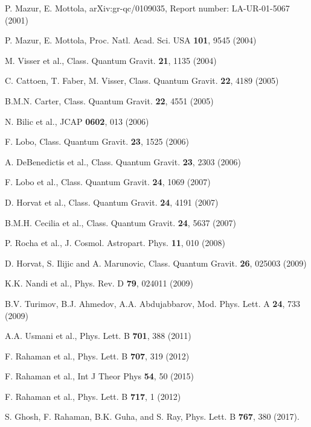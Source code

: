 \documentclass[preprint,12pt]{elsarticle}
\begin{document}
\begin{thebibliography}{99}

 P. Mazur, E. Mottola, arXiv:gr-qc/0109035, Report number: LA-UR-01-5067 (2001)

 P. Mazur, E. Mottola, Proc. Natl. Acad. Sci. USA \textbf{101}, 9545 (2004)

 M. Visser et al., Class. Quantum Gravit. \textbf {21}, 1135 (2004)

 C. Cattoen, T. Faber, M. Visser, Class. Quantum Gravit. \textbf {22}, 4189 (2005)

 B.M.N. Carter, Class. Quantum Gravit. \textbf{22}, 4551 (2005)

 N. Bilic et al., JCAP \textbf{0602}, 013 (2006)

 F. Lobo, Class. Quantum Gravit. \textbf{23}, 1525 (2006)

 A. DeBenedictis et al., Class. Quantum Gravit. \textbf{23}, 2303 (2006)

 F. Lobo et al., Class. Quantum Gravit. \textbf{24}, 1069 (2007)

 D. Horvat et al., Class. Quantum Gravit. \textbf{24}, 4191 (2007)

 B.M.H. Cecilia et al., Class. Quantum Gravit. \textbf{24}, 5637 (2007)

 P. Rocha et al., J. Cosmol. Astropart. Phys. \textbf{11}, 010 (2008)

 D. Horvat, S. Ilijic and A. Marunovic, Class. Quantum Gravit. \textbf{26}, 025003 (2009)

 K.K. Nandi et al., Phys. Rev. D {\bf 79}, 024011 (2009)

 B.V. Turimov, B.J. Ahmedov, A.A. Abdujabbarov, Mod. Phys. Lett. A \textbf{24}, 733 (2009)

 A.A. Usmani et al., Phys. Lett. B \textbf{701}, 388 (2011)

 F. Rahaman et al., Phys. Lett. B \textbf{707}, 319 (2012)

 F. Rahaman et al., Int J Theor Phys \textbf{54}, 50 (2015)

 F. Rahaman et al., Phys. Lett. B \textbf{717}, 1 (2012)

 S. Ghosh, F. Rahaman, B.K. Guha, and S. Ray, Phys. Lett. B \textbf{767}, 380 (2017).


\end{thebibliography}
\end{document}
